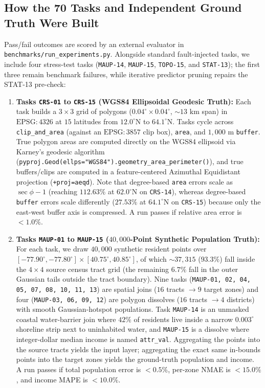 \documentclass[10pt,twocolumn]{article}
\begin{document}
\subsection{How the 70 Tasks and Independent Ground Truth Were Built}
Pass/fail outcomes are scored by an external evaluator in \texttt{benchmarks/\allowbreak run\_experiments.py}. Alongside standard fault-injected tasks, we include four stress-test tasks (\texttt{MAUP-14}, \texttt{MAUP-15}, \texttt{TOPO-15}, and \texttt{STAT-13}); the first three remain benchmark failures, while iterative predictor pruning repairs the STAT-13 pre-check:
\begin{enumerate}
  \item \textbf{Tasks \texttt{CRS-01} to \texttt{CRS-15} (WGS84 Ellipsoidal Geodesic Truth):} Each task builds a $3 \times 3$ grid of polygons ($0.04^\circ \times 0.04^\circ$, $\sim 13\text{ km}$ span) in $\text{EPSG}:4326$ at $15$ latitudes from $12.0^\circ\text{N}$ to $64.1^\circ\text{N}$. Tasks cycle across \texttt{clip\_and\_area} (against an $\text{EPSG}:3857$ clip box), \texttt{area}, and $1,000\text{ m}$ \texttt{buffer}. True polygon areas are computed directly on the WGS84 ellipsoid via Karney's geodesic algorithm \cite{karney2013algorithms} (\texttt{pyproj.Geod\allowbreak(ellps="WGS84").\allowbreak geometry\_area\_\allowbreak perimeter()}), and true buffers/clips are computed in a feature-centered Azimuthal Equidistant projection (\texttt{+proj=aeqd}). Note that degree-based \texttt{area} errors scale as $\sec\phi - 1$ (reaching $112.63\%$ at $62.0^\circ\text{N}$ on \texttt{CRS-14}), whereas degree-based \texttt{buffer} errors scale differently ($27.53\%$ at $64.1^\circ\text{N}$ on \texttt{CRS-15}) because only the east-west buffer axis is compressed. A run passes if relative area error is $< 1.0\%$.
  \item \textbf{Tasks \texttt{MAUP-01} to \texttt{MAUP-15} ($40,000$-Point Synthetic Population Truth):} For each task, we draw $40,000$ synthetic resident points over $[-77.90^\circ, -77.80^\circ] \times [40.75^\circ, 40.85^\circ]$, of which $\sim 37,315$ ($93.3\%$) fall inside the $4 \times 4$ source census tract grid (the remaining $6.7\%$ fall in the outer Gaussian tails outside the tract boundary). Nine tasks (\texttt{MAUP-01, 02, 04, 05, 07, 08, 10, 11, 13}) are spatial joins ($16$ tracts $\to 9$ target zones) and four (\texttt{MAUP-03, 06, 09, 12}) are polygon dissolves ($16$ tracts $\to 4$ districts) with smooth Gaussian-hotspot populations. Task \texttt{MAUP-14} is an unmasked coastal water-barrier join where $42\%$ of residents live inside a narrow $0.003^\circ$ shoreline strip next to uninhabited water, and \texttt{MAUP-15} is a dissolve where integer-dollar median income is named \texttt{attr\_val}. Aggregating the points into the source tracts yields the input layer; aggregating the exact same in-bounds points into the target zones yields the ground-truth population and income. A run passes if total population error is $< 0.5\%$, per-zone NMAE is $< 15.0\%$, and income MAPE is $< 10.0\%$.

\end{enumerate}
\end{document}
